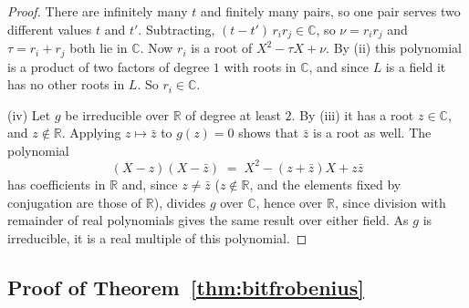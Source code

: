 \documentclass[11pt]{article}
\theoremstyle{plain}
\theoremstyle{definition}
\theoremstyle{plain}
\theoremstyle{definition}
\newcommand{\R}{\mathbb{R}}
\newcommand{\C}{\mathbb{C}}
\begin{document}
\begin{proof}
There are infinitely many $t$ and finitely many pairs, so one pair serves two different values $t$ and $t'$. Subtracting, $(t - t')\,r_{i}r_{j} \in \C$, so $\nu = r_{i}r_{j}$ and $\tau = r_{i} + r_{j}$ both lie in $\C$. Now $r_{i}$ is a root of $X^{2} - \tau X + \nu$. By (ii) this polynomial is a product of two factors of degree $1$ with roots in $\C$, and since $L$ is a field it has no other roots in $L$. So $r_{i} \in \C$.

(iv) Let $g$ be irreducible over $\R$ of degree at least $2$. By (iii) it has a root $z \in \C$, and $z \notin \R$. Applying $z \mapsto \bar{z}$ to $g(z) = 0$ shows that $\bar{z}$ is a root as well. The polynomial
\[
(X - z)(X - \bar{z}) \;=\; X^{2} - (z + \bar{z})X + z\bar{z}
\]
has coefficients in $\R$ and, since $z \neq \bar{z}$ ($z \notin \R$, and the elements fixed by conjugation are those of $\R$), divides $g$ over $\C$, hence over $\R$, since division with remainder of real polynomials gives the same result over either field. As $g$ is irreducible, it is a real multiple of this polynomial.
\end{proof}

\subsection{\texorpdfstring{Proof of Theorem~\ref{thm:bitfrobenius}}{Proof of Theorem 6.4}}\label{prf:thm:bitfrobenius}
\end{document}

